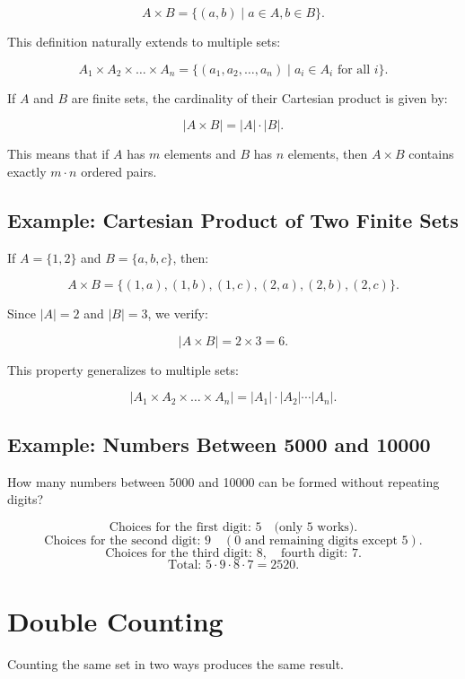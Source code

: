 \documentclass[11pt]{article}
\newcommand{\card}[1]{\lvert #1 \rvert}
\begin{document}
\[
A \times B = \{ (a, b) \mid a \in A, b \in B \}.
\]

This definition naturally extends to multiple sets:

\[
A_1 \times A_2 \times \dots \times A_n = \{ (a_1, a_2, \dots, a_n) \mid a_i \in A_i \text{ for all } i \}.
\]

If $ A $ and $ B $ are finite sets, the cardinality of their Cartesian product is given by:

\[
\card{A \times B} = \card{A} \cdot \card{B}.
\]

This means that if $ A $ has $ m $ elements and $ B $ has $ n $ elements, then $ A \times B $ contains exactly $ m \cdot n $ ordered pairs.

\subsection*{Example: Cartesian Product of Two Finite Sets}
If $ A = \{1, 2\} $ and $ B = \{a, b, c\} $, then:

\[
A \times B = \{ (1, a), (1, b), (1, c), (2, a), (2, b), (2, c) \}.
\]

Since $ \card{A} = 2 $ and $ \card{B} = 3 $, we verify:

\[
\card{A \times B} = 2 \times 3 = 6.
\]

This property generalizes to multiple sets:

\[
\card{A_1 \times A_2 \times \dots \times A_n} = \card{A_1} \cdot \card{A_2} \cdots \card{A_n}.
\]

\subsection*{Example: Numbers Between 5000 and 10000}
How many numbers between 5000 and 10000 can be formed without repeating digits?

\[
\text{Choices for the first digit: } 5 \quad \text{(only 5 works)}.
\]
\[
\text{Choices for the second digit: } 9 \quad (0 \text{ and remaining digits except }5).
\]
\[
\text{Choices for the third digit: } 8, \quad \text{fourth digit: } 7.
\]
\[
\text{Total: } 5 \cdot 9 \cdot 8 \cdot 7 = 2520.
\]

\section{Double Counting}

Counting the same set in two ways produces the same result.
\end{document}
